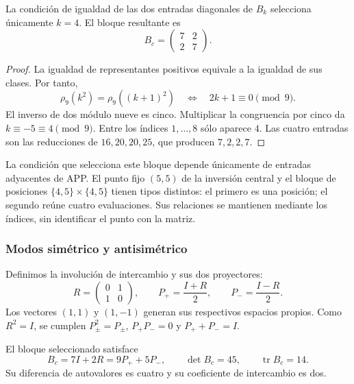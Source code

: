 \begin{teorema}
\label{geo:thm-bloque}
La condición de igualdad de las dos entradas diagonales de $B_k$ selecciona únicamente $k=4$. El bloque resultante es
\[
 B_c=\begin{pmatrix}7&2\\2&7\end{pmatrix}.
\]
\end{teorema}

\begin{proof}
La igualdad de representantes positivos equivale a la igualdad de sus clases. Por tanto,
\[
 \rho_9(k^2)=\rho_9((k+1)^2)
 \quad\Longleftrightarrow\quad 2k+1\equiv0\pmod9.
\]
El inverso de dos módulo nueve es cinco. Multiplicar la congruencia por cinco da $k\equiv-5\equiv4\pmod9$. Entre los índices $1,\ldots,8$ sólo aparece $4$. Las cuatro entradas son las reducciones de $16,20,20,25$, que producen $7,2,2,7$.
\end{proof}

La condición que selecciona este bloque depende únicamente de entradas adyacentes de APP. El punto fijo $(5,5)$ de la inversión central y el bloque de posiciones $\{4,5\}\times\{4,5\}$ tienen tipos distintos: el primero es una posición; el segundo reúne cuatro evaluaciones. Sus relaciones se mantienen mediante los índices, sin identificar el punto con la matriz.

\subsubsection{Modos simétrico y antisimétrico}

Definimos la involución de intercambio y sus dos proyectores:
\[
 R=\begin{pmatrix}0&1\\1&0\end{pmatrix},\qquad
 P_+=\frac{I+R}{2},\qquad P_-=\frac{I-R}{2}.
\]
Los vectores $(1,1)$ y $(1,-1)$ generan sus respectivos espacios propios. Como $R^2=I$, se cumplen $P_\pm^2=P_\pm$, $P_+P_-=0$ y $P_++P_-=I$.

\begin{proposicion}
\label{geo:prop-espectro-central}
El bloque seleccionado satisface
\[
 B_c=7I+2R=9P_++5P_-,\qquad
 \det B_c=45,\qquad \operatorname{tr}B_c=14.
\]
Su diferencia de autovalores es cuatro y su coeficiente de intercambio es dos.
\end{proposicion}

